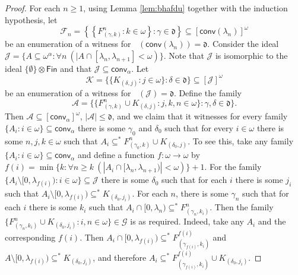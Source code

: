 \documentclass{amsart}
\theoremstyle{plain}
\theoremstyle{definition}
\theoremstyle{remark}
\newcommand{\cA}{\mathcal{A}}
\newcommand{\cG}{\mathcal{G}}
\newcommand{\cJ}{\mathcal{J}}
\newcommand{\J}{\cJ}
\newcommand{\dnumber}{\mathfrak{d}}
\DeclareMathOperator{\cof}{cof}
\DeclareMathOperator{\cofo}{\cof^*_{\omega}}
\newcommand{\FIN}{\mathsf{Fin}}
\newcommand{\fin}{\FIN}
\newcommand{\conv}{\mathsf{conv}}
\renewcommand{\subset}{\subseteq}
\begin{document}
\begin{proof}
     For each $n\geq1$, using Lemma \ref{lem:bhafdu} together with the induction hypothesis, let $$\mathcal{F}_n=\left\{\left\{F^n_{(\gamma,k)}:k\in\omega\right\} : \gamma\in \dnumber \right\} \subset [\conv(\lambda_n)]^\omega$$ be an enumeration of a witness for $\cofo(\conv(\lambda_n))=\dnumber$. Consider the ideal $\mathcal{J}=\{A\subset \omega^\alpha : \forall n \ (|A\cap [\lambda_n, \lambda_{n+1}]< \omega )\}.$ Note that $\mathcal{J}$ is isomorphic to the ideal $\{\emptyset\}\otimes\fin$ and that $\mathcal{J}\subset \conv_\alpha$.  Let $$\mathcal{K}=\{\{K_{(\delta,j)}:j\in\omega\} : \delta\in \dnumber\} \subset [\J]^\omega$$ be an enumeration of a witness for $\cofo(\J)=\dnumber$.  Define the family $$\cA=\{\{F^n_{(\gamma,k)}\cup K_{(\delta,j)}:j,k,n\in\omega\} : \gamma, \delta\in\dnumber\}.$$ Then $\cA\subset[\conv_\alpha]^\omega$, $|\cA|\leq\dnumber$, and we claim that it witnesses for every family $\{A_i :i\in\omega\}\subset \conv_\alpha$ there is some $\gamma_0$ and $\delta_0$ such that for every $i\in\omega $ there is some $n,j,k\in\omega$ such that $A_i\subset^*F^n_{(\gamma_0,k)}\cup K_{(\delta_0,j)}$.
     To see this, take any  family $\{A_i :i\in\omega\}\subset \conv_\alpha$ and define a function $f:\omega\to\omega$ by $f(i)=\min\{k:\forall n\geq k \ (|A_i\cap [\lambda_n,\lambda_{n+1})|<\omega)\}+1$. For the family $\{A_i\setminus[0, \lambda_{f(i)}) : i\in\omega\}\subset \J$ there is some $\delta_0$ such that for each $i$ there is some $j_i$ such that $A_i\setminus[0, \lambda_{f(i)})\subset^*K_{(\delta_0,j_i)}$. For each $n$,  there is some $\gamma_n$ such that for each $i$ there is some $k_i$ such that $A_i\cap [0, \lambda_n)\subset^*F^n_{(\gamma_n,k_i)}$. Then the family $\{F^n_{(\gamma_n,k_i)}\cup K_{(\delta_0,j_i)}:i,n\in\omega\}\in \cG$ is as required. Indeed, take any $A_i$ and the corresponding $f(i)$. Then $A_i\cap [0,\lambda_{f(i)})\subset^*F^{f(i)}_{(\gamma_{f(i)},k_i)}$ and $A\setminus [0,\lambda_{f(i)})\subset^*K_{(\delta_0,j_i)}$, and therefore $A_i\subset^*F^{f(i)}_{(\gamma_{f(i)},k_i)}\cup K_{(\delta_0,j_i)}$.
     






 


\end{proof}
\end{document}

